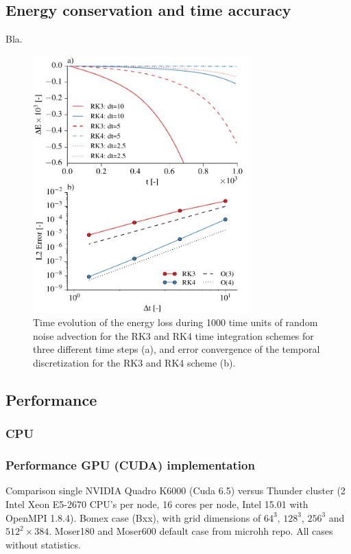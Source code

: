 \documentclass[gmd]{copernicus}
\begin{document}
\subsection{Energy conservation and time accuracy}\label{sec:validationtime}
Bla.
\begin{figure}[t]
\vspace*{2mm}
\begin{center}
\includegraphics[width=8.3cm]{figs/timeconvergence.pdf}
\end{center}
\caption{Time evolution of the energy loss during 1000 time units of random noise advection for the RK3 and RK4 time integration schemes for three different time steps (a), and error convergence of the temporal discretization for the RK3 and RK4 scheme (b).}
\end{figure}

\subsection{Performance}\label{sec:performance}
\subsubsection{CPU}
\subsubsection{Performance GPU (CUDA) implementation}

Comparison single NVIDIA Quadro K6000 (Cuda 6.5) versus Thunder cluster (2 Intel Xeon E5-2670 CPU's per node, 16 cores per node, Intel 15.01 with OpenMPI 1.8.4). Bomex case (Bxx), with grid dimensions of $64^3$, $128^3$, $256^3$ and $512^2 \times 384$. Moser180 and Moser600 default case from microhh repo. All cases without statistics. 
\end{document}
